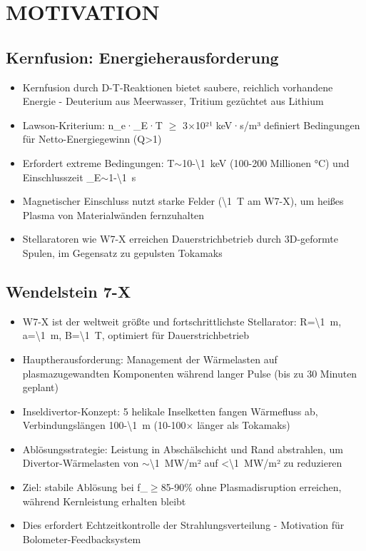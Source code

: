 \documentclass[11pt,a4paper]{article}
\begin{document}
\section{MOTIVATION}

\subsection{Kernfusion: Energieherausforderung}

\begin{itemize}
\item Kernfusion durch D-T-Reaktionen bietet saubere, reichlich vorhandene Energie - Deuterium aus Meerwasser, Tritium gezüchtet aus Lithium
\item Lawson-Kriterium: n_e·\tau_E·T $\geq$ 3$\times$10²¹ keV·s/m³ definiert Bedingungen für Netto-Energiegewinn (Q>1)
\item Erfordert extreme Bedingungen: T$\sim$10-\SI{\1}{keV} (100-200 Millionen °C) und Einschlusszeit \tau_E$\sim$1-\SI{\1}{s}
\item Magnetischer Einschluss nutzt starke Felder (\SI{\1}{T} am W7-X), um heißes Plasma von Materialwänden fernzuhalten
\item Stellaratoren wie W7-X erreichen Dauerstrichbetrieb durch 3D-geformte Spulen, im Gegensatz zu gepulsten Tokamaks
\end{itemize}

\subsection{Wendelstein 7-X}

\begin{itemize}
\item W7-X ist der weltweit größte und fortschrittlichste Stellarator: R=\SI{\1}{m}, a=\SI{\1}{m}, B=\SI{\1}{T}, optimiert für Dauerstrichbetrieb
\item Hauptherausforderung: Management der Wärmelasten auf plasmazugewandten Komponenten während langer Pulse (bis zu 30 Minuten geplant)
\item Inseldivertor-Konzept: 5 helikale Inselketten fangen Wärmefluss ab, Verbindungslängen 100-\SI{\1}{m} (10-100$\times$ länger als Tokamaks)
\item Ablösungsstrategie: Leistung in Abschälschicht und Rand abstrahlen, um Divertor-Wärmelasten von $\sim$\SI{\1}{MW}/m² auf <\SI{\1}{MW}/m² zu reduzieren
\item Ziel: stabile Ablösung bei f_{}$\geq$85-90\% ohne Plasmadisruption erreichen, während Kernleistung erhalten bleibt
\item Dies erfordert Echtzeitkontrolle der Strahlungsverteilung - Motivation für Bolometer-Feedbacksystem
\end{itemize}
\end{document}

